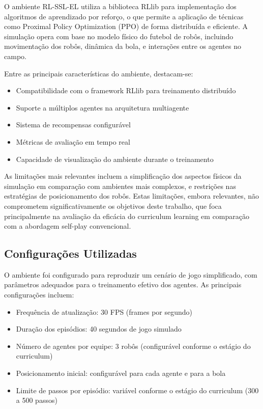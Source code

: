 O ambiente RL-SSL-EL utiliza a biblioteca RLlib para implementação dos algoritmos de aprendizado por reforço, o que permite a aplicação de técnicas como Proximal Policy Optimization (PPO) de forma distribuída e eficiente. A simulação opera com base no modelo físico do futebol de robôs, incluindo movimentação dos robôs, dinâmica da bola, e interações entre os agentes no campo.

Entre as principais características do ambiente, destacam-se:

\begin{itemize}
    \item Compatibilidade com o framework RLlib para treinamento distribuído
    \item Suporte a múltiplos agentes na arquitetura multiagente
    \item Sistema de recompensas configurável
    \item Métricas de avaliação em tempo real
    \item Capacidade de visualização do ambiente durante o treinamento
\end{itemize}

As limitações mais relevantes incluem a simplificação dos aspectos físicos da simulação em comparação com ambientes mais complexos, e restrições nas estratégias de posicionamento dos robôs. Estas limitações, embora relevantes, não comprometem significativamente os objetivos deste trabalho, que foca principalmente na avaliação da eficácia do curriculum learning em comparação com a abordagem self-play convencional.

\subsection{Configurações Utilizadas}

O ambiente foi configurado para reproduzir um cenário de jogo simplificado, com parâmetros adequados para o treinamento efetivo dos agentes. As principais configurações incluem:

\begin{itemize}
    \item Frequência de atualização: 30 FPS (frames por segundo)
    \item Duração dos episódios: 40 segundos de jogo simulado
    \item Número de agentes por equipe: 3 robôs (configurável conforme o estágio do curriculum)
    \item Posicionamento inicial: configurável para cada agente e para a bola
    \item Limite de passos por episódio: variável conforme o estágio do curriculum (300 a 500 passos)
\end{itemize}

